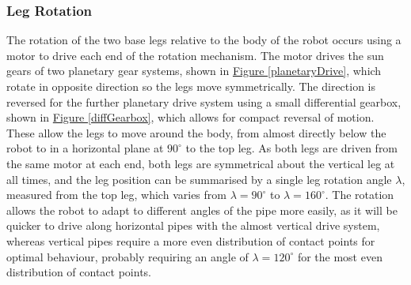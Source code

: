 \documentclass[11pt]{article}		%
\newcommand{\figref}[1]{\hyperref[#1]{Figure \ref*{#1}}}    %
\begin{document}
			\subsubsection{Leg Rotation}
				
				The rotation of the two base legs relative to the body of the robot occurs using a motor to drive each end of the rotation mechanism.
				The motor drives the sun gears of two planetary gear systems, shown in \figref{planetaryDrive}, which rotate in opposite direction so the legs move symmetrically.
				The direction is reversed for the further planetary drive system using a small differential gearbox, shown in \figref{diffGearbox}, which allows for compact reversal of motion.
				These allow the legs to move around the body, from almost directly below the robot to in a horizontal plane at $90^\circ$ to the top leg.
				As both legs are driven from the same motor at each end, both legs are symmetrical about the vertical leg at all times, and the leg position can be summarised by a single leg rotation angle $\lambda$, measured from the top leg, which varies from $\lambda = 90^\circ$ to $\lambda = 160^\circ$.
				The rotation allows the robot to adapt to different angles of the pipe more easily, as it will be quicker to drive along horizontal pipes with the almost vertical drive system, whereas vertical pipes require a more even distribution of contact points for optimal behaviour, probably requiring an angle of $\lambda = 120^\circ$ for the most even distribution of contact points.
										
\end{document}
